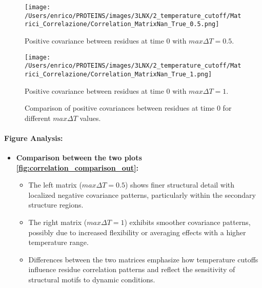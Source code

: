 \documentclass[English, Lau, oneside]{sapthesis}
\begin{document}
\begin{figure}[h!]
    \centering
    \begin{minipage}{0.49\textwidth}
        \centering
        \texttt{[image: /Users/enrico/PROTEINS/images/3LNX/2\_temperature\_cutoff/Matrici\_Correlazione/Correlation\_MatrixNan\_True\_0.5.png]}
        \caption{Positive covariance between residues at time 0 with $max \Delta T = 0.5$.}
        
    \end{minipage}
    \hfill
    \begin{minipage}{0.49\textwidth}
        \centering
        \texttt{[image: /Users/enrico/PROTEINS/images/3LNX/2\_temperature\_cutoff/Matrici\_Correlazione/Correlation\_MatrixNan\_True\_1.png]}
        \caption{Positive covariance between residues at time 0 with $max \Delta T = 1$.}
        
    \end{minipage}
    \caption{Comparison of positive covariances between residues at time 0 for different $max \Delta T$ values.}
    \label{fig:correlation_positive_comparison_out}
\end{figure}



\paragraph{Figure Analysis:}

\begin{itemize}
    \item \textbf{Comparison between the two plots \ref{fig:correlation_comparison_out}:}
    \begin{itemize}
        \item The left matrix (\(max \Delta T = 0.5\)) shows finer structural detail with localized negative covariance patterns, particularly within the secondary structure regions.
        \item The right matrix (\(max \Delta T = 1\)) exhibits smoother covariance patterns, possibly due to increased flexibility or averaging effects with a higher temperature range.
        \item Differences between the two matrices emphasize how temperature cutoffs influence residue correlation patterns and reflect the sensitivity of structural motifs to dynamic conditions.
    \end{itemize}
\end{itemize}
\end{document}
